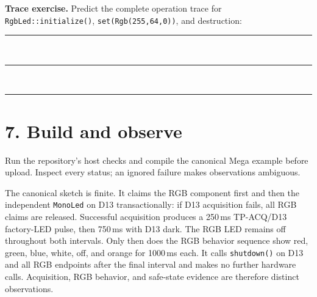\documentclass[11pt]{article}
\newcommand{\blankline}{\rule{0.96\linewidth}{0.35pt}}
\begin{document}
\textbf{Trace exercise.} Predict the complete operation trace for
\texttt{RgbLed::initialize()}, \texttt{set(Rgb(255,64,0))}, and destruction:

\blankline\\[5pt]\blankline\\[5pt]\blankline

\section*{7. Build and observe}

Run the repository's host checks and compile the canonical Mega example before
upload. Inspect every status; an ignored failure makes observations ambiguous.


The canonical sketch is finite. It claims the RGB component first and then the
independent \texttt{MonoLed} on D13 transactionally: if D13 acquisition fails,
all RGB claims are released. Successful acquisition produces a 250\,ms
TP-ACQ/D13 factory-LED pulse, then 750\,ms with D13 dark. The RGB LED remains
off throughout both intervals. Only then does the RGB behavior sequence show
red, green, blue, white, off, and orange for 1000\,ms each. It calls
\texttt{shutdown()} on D13 and all RGB endpoints after the final interval and
makes no further hardware calls. Acquisition, RGB behavior, and safe-state
evidence are therefore distinct observations.
\end{document}
